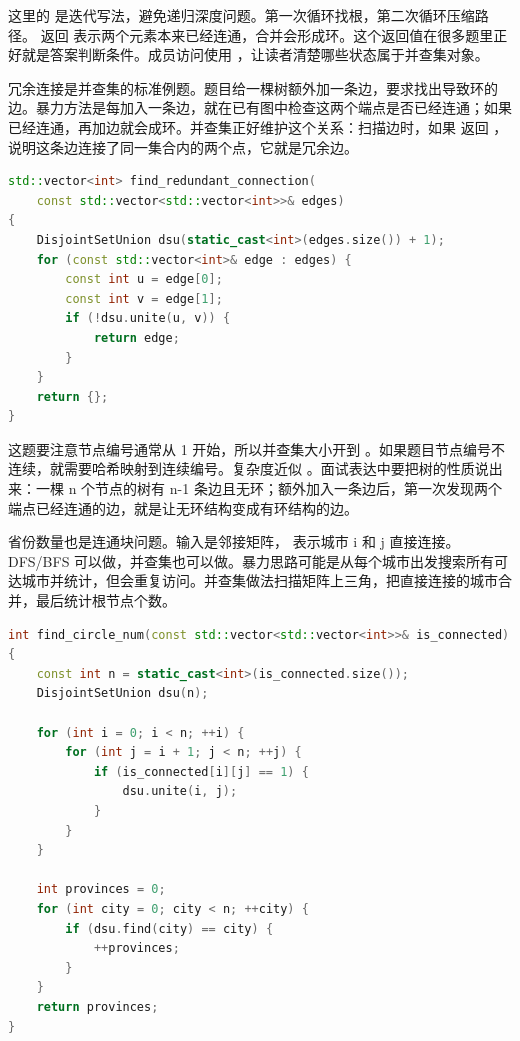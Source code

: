 这里的  是迭代写法，避免递归深度问题。第一次循环找根，第二次循环压缩路径。  返回  表示两个元素本来已经连通，合并会形成环。这个返回值在很多题里正好就是答案判断条件。成员访问使用 ，让读者清楚哪些状态属于并查集对象。

冗余连接是并查集的标准例题。题目给一棵树额外加一条边，要求找出导致环的边。暴力方法是每加入一条边，就在已有图中检查这两个端点是否已经连通；如果已经连通，再加边就会成环。并查集正好维护这个关系：扫描边时，如果  返回 ，说明这条边连接了同一集合内的两个点，它就是冗余边。

\begin{lstlisting}[language=C++,caption={LeetCode 684 冗余连接：合并失败的边就是成环边}]
std::vector<int> find_redundant_connection(
    const std::vector<std::vector<int>>& edges)
{
    DisjointSetUnion dsu(static_cast<int>(edges.size()) + 1);
    for (const std::vector<int>& edge : edges) {
        const int u = edge[0];
        const int v = edge[1];
        if (!dsu.unite(u, v)) {
            return edge;
        }
    }
    return {};
}
\end{lstlisting}

这题要注意节点编号通常从 1 开始，所以并查集大小开到 。如果题目节点编号不连续，就需要哈希映射到连续编号。复杂度近似 。面试表达中要把树的性质说出来：一棵 n 个节点的树有 n-1 条边且无环；额外加入一条边后，第一次发现两个端点已经连通的边，就是让无环结构变成有环结构的边。

省份数量也是连通块问题。输入是邻接矩阵， 表示城市 i 和 j 直接连接。DFS/BFS 可以做，并查集也可以做。暴力思路可能是从每个城市出发搜索所有可达城市并统计，但会重复访问。并查集做法扫描矩阵上三角，把直接连接的城市合并，最后统计根节点个数。

\begin{lstlisting}[language=C++,caption={LeetCode 547 省份数量：邻接矩阵合并连通城市}]
int find_circle_num(const std::vector<std::vector<int>>& is_connected)
{
    const int n = static_cast<int>(is_connected.size());
    DisjointSetUnion dsu(n);

    for (int i = 0; i < n; ++i) {
        for (int j = i + 1; j < n; ++j) {
            if (is_connected[i][j] == 1) {
                dsu.unite(i, j);
            }
        }
    }

    int provinces = 0;
    for (int city = 0; city < n; ++city) {
        if (dsu.find(city) == city) {
            ++provinces;
        }
    }
    return provinces;
}
\end{lstlisting}

